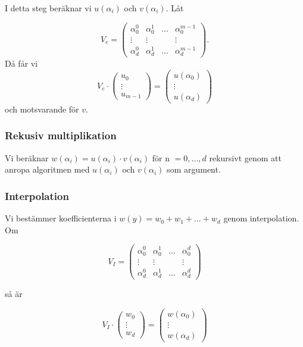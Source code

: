 \documentclass[a4paper]{article}
\begin{document}
I detta steg beräknar vi $u(\alpha_i)$ och $v(\alpha_i)$. Låt

\begin{equation}
\label{eq:NAME}
V_e =
\begin{pmatrix}
  \alpha_0^0 & \alpha_0^1 & ... & \alpha_0^{m-1}\\
  \vdots & \vdots & & \vdots \\
  \alpha_d^0 & \alpha_d^1 & ... & \alpha_d^{m-1}
\end{pmatrix}.
\end{equation}
Då får vi
\begin{equation}
\label{eq:NAME2}
V_e \cdot
\begin{pmatrix}
  u_0\\
  \vdots \\
  u_{m-1}
\end{pmatrix}
 =
\begin{pmatrix}
 u(\alpha_0)\\
 \vdots \\
 u(\alpha_d)
\end{pmatrix}
\end{equation}
och motsvarande för $v$.

\subsubsection{Rekusiv multiplikation}
Vi beräknar $w(\alpha_i)=u(\alpha_i) \cdot v(\alpha_i)$ för n $= 0, ... , d$ rekursivt genom att anropa algoritmen
med $u(\alpha_i)$ och $v(\alpha_i)$ som argument.

\subsubsection{Interpolation}
Vi bestämmer koefficienterna i $w(y)=w_0 + w_1 + \ldots + w_d$ genom interpolation. Om

\begin{equation}
\label{eq:NAME3}
V_I =
\begin{pmatrix}
  \alpha_0^0 & \alpha_0^1 & ... & \alpha_0^d\\
  \vdots & \vdots & & \vdots \\
  \alpha_d^0 & \alpha_d^1 & ... & \alpha_d^d
\end{pmatrix}
\end{equation}

så är

\begin{equation}
\label{eq:NAME4}
V_I \cdot
\begin{pmatrix}
  w_0\\
  \vdots\\
  w_d
\end{pmatrix}
=
\begin{pmatrix}
  w(\alpha_0)\\
  \vdots\\
  w(\alpha_d)
\end{pmatrix}
\end{equation}
\end{document}
